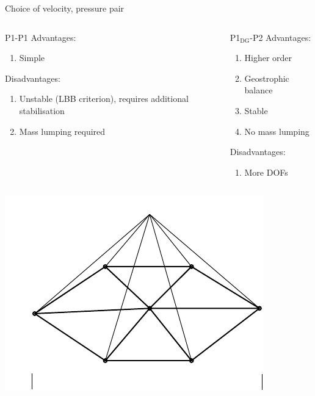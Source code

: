 \documentclass[12pt]{beamer}
\newcommand\poo{P1-P1}
\newcommand\podgpt{P1$_{\text{DG}}$-P2}
\begin{document}
\begin{frame}{Choice of velocity, pressure pair}
  \vspace{-1em}
  \begin{columns}
    \begin{column}{0.5\textwidth}
      \begin{exampleblock}{\poo}
        Advantages:
        \begin{enumerate}
          \item Simple
        \end{enumerate}
        Disadvantages:
        \begin{enumerate}
          \item Unstable (LBB criterion), requires additional stabilisation
          \item Mass lumping required
        \end{enumerate}
      \end{exampleblock}
    \end{column}
    \begin{column}{0.5\textwidth}
      \begin{exampleblock}{\podgpt}
        Advantages:
        \begin{enumerate}
          \item Higher order
          \item Geostrophic balance
          \item Stable
          \item No mass lumping
        \end{enumerate}
        Disadvantages:
        \begin{enumerate}
          \item More DOFs
        \end{enumerate}
      \end{exampleblock}
    \end{column}
  \end{columns}

  \vspace{-0.5em}
  \begin{columns}
    \begin{column}{0.25\textwidth}
      \includegraphics[width=\textwidth,clip,trim=0 20 0 0]{P1cgshapefunction2d_tex}


\end{column}
\end{columns}
\end{frame}
\end{document}
